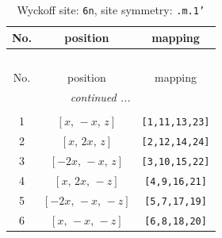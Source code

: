 \documentclass[fleqn,8pt]{jsarticle}
\begin{document}
\renewcommand{\arraystretch}{1.2}
\begin{longtable}{ccc}
\caption{Wyckoff site: {\tt 6n}, site symmetry: {\tt .m.1'}}
 \\
 \hline \hline
No. & position & mapping \\ \hline \endfirsthead

\multicolumn{2}{l}{\tablename\ \thetable{}} \\
 \hline \hline
No. & position & mapping \\ \hline \endhead

 \hline \hline
\multicolumn{2}{r}{\footnotesize\it continued ...} \\ \endfoot

 \hline \hline
\multicolumn{2}{r}{} \\ \endlastfoot

1 & $\left[ x,\, - x,\, z \right]$ & {\tt [1,11,13,23]} \\ \hline
2 & $\left[ x,\, 2 x,\, z \right]$ & {\tt [2,12,14,24]} \\ \hline
3 & $\left[ - 2 x,\, - x,\, z \right]$ & {\tt [3,10,15,22]} \\ \hline
4 & $\left[ x,\, 2 x,\, - z \right]$ & {\tt [4,9,16,21]} \\ \hline
5 & $\left[ - 2 x,\, - x,\, - z \right]$ & {\tt [5,7,17,19]} \\ \hline
6 & $\left[ x,\, - x,\, - z \right]$ & {\tt [6,8,18,20]} \\
\end{longtable}
\renewcommand{\arraystretch}{1.2}
\end{document}
